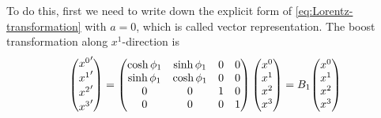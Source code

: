 To do this, first we need to write down the explicit form of \eqref{eq:Lorentz-transformation} with $a=0$, which is called vector representation. The boost transformation along $x^1$-direction is
\begin{equation} \label{eq:explicit-form-of-boost}
  \mqty({x^0}' \\ {x^1}' \\ {x^2}' \\{x^3}')
  = \mqty(\cosh \f_1 & \sinh \f_1 & 0 & 0 \\
          \sinh \f_1 & \cosh \f_1 & 0 & 0 \\
          0          &  0         & 1 & 0 \\
          0          &  0         & 0 & 1) \,
    \mqty(x^0 \\ x^1 \\ x^2 \\x^3)
  = B_1 \mqty(x^0 \\ x^1 \\ x^2 \\x^3)
\end{equation}

